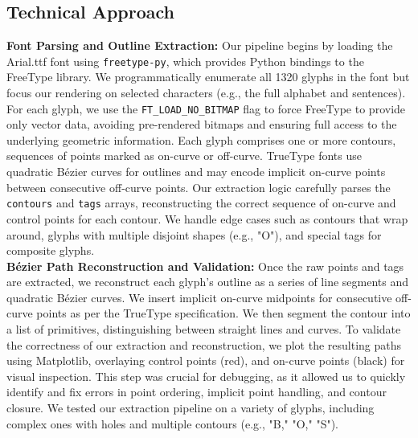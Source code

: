 \documentclass[11pt]{article}
\begin{document}
\subsection{Technical Approach}
\textbf{Font Parsing and Outline Extraction:} Our pipeline begins by loading the Arial.ttf font using \texttt{freetype-py}, which provides Python bindings to the FreeType library. We programmatically enumerate all 1320 glyphs in the font but focus our rendering on selected characters (e.g., the full alphabet and sentences). For each glyph, we use the \texttt{FT\_LOAD\_NO\_BITMAP} flag to force FreeType to provide only vector data, avoiding pre-rendered bitmaps and ensuring full access to the underlying geometric information. Each glyph comprises one or more contours, sequences of points marked as on-curve or off-curve. TrueType fonts use quadratic Bézier curves for outlines and may encode implicit on-curve points between consecutive off-curve points. Our extraction logic carefully parses the \texttt{contours} and \texttt{tags} arrays, reconstructing the correct sequence of on-curve and control points for each contour. We handle edge cases such as contours that wrap around, glyphs with multiple disjoint shapes (e.g., "O"), and special tags for composite glyphs. \\

\textbf{Bézier Path Reconstruction and Validation:} Once the raw points and tags are extracted, we reconstruct each glyph's outline as a series of line segments and quadratic Bézier curves. We insert implicit on-curve midpoints for consecutive off-curve points as per the TrueType specification. We then segment the contour into a list of primitives, distinguishing between straight lines and curves. To validate the correctness of our extraction and reconstruction, we plot the resulting paths using Matplotlib, overlaying control points (red), and on-curve points (black) for visual inspection. This step was crucial for debugging, as it allowed us to quickly identify and fix errors in point ordering, implicit point handling, and contour closure. We tested our extraction pipeline on a variety of glyphs, including complex ones with holes and multiple contours (e.g., "B," "O," "S"). \\
\end{document}
